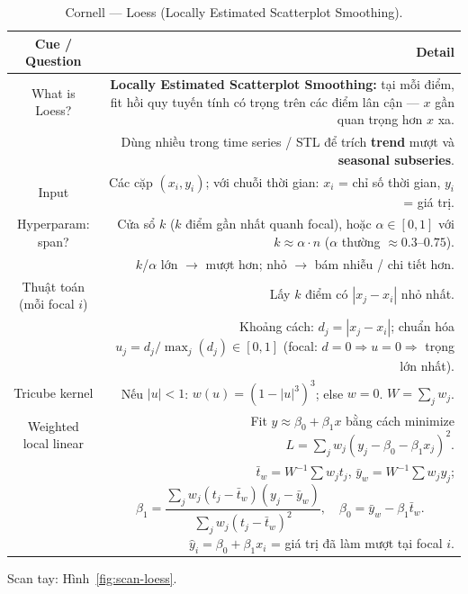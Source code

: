 \documentclass[12pt,a4paper]{article}
\newcommand{\cornellhead}{%
  \toprule
  \textbf{Cue / Question} & \textbf{Detail} \\
  \midrule
}
\begin{document}
\begin{table}[H]
  \centering
  \caption{Cornell --- Loess (Locally Estimated Scatterplot Smoothing).}
  \label{tab:cornell-loess}
  \small
  \begin{tabularx}{\textwidth}{@{}CD@{}}
    \cornellhead
    What is Loess? &
    \textbf{Locally Estimated Scatterplot Smoothing:}
    tại mỗi điểm, fit hồi quy tuyến tính có trọng trên các điểm lân cận ---
    \(x\) gần quan trọng hơn \(x\) xa. \\
                        & Dùng nhiều trong time series / STL để trích
    \textbf{trend} mượt và \textbf{seasonal subseries}. \\
    \addlinespace
    Input               &
    Các cặp \((x_i, y_i)\); với chuỗi thời gian:
    \(x_i\) = chỉ số thời gian, \(y_i\) = giá trị. \\
    \addlinespace
    Hyperparam: span?   &
    Cửa sổ \(k\) (\(k\) điểm gần nhất quanh focal), hoặc \(\alpha \in [0,1]\)
    với \(k \approx \alpha\cdot n\) (\(\alpha\) thường \(\approx 0.3\)--\(0.75\)). \\
                        & \(k\)/\(\alpha\) lớn $\to$ mượt hơn; nhỏ $\to$ bám nhiễu / chi tiết hơn. \\
    \addlinespace
    Thuật toán (mỗi focal \(i\)) &
    Lấy \(k\) điểm có \(|x_j - x_i|\) nhỏ nhất. \\
                        & Khoảng cách: \(d_j = |x_j - x_i|\);
    chuẩn hóa \(u_j = d_j / \max_j(d_j) \in [0,1]\)
    (focal: \(d=0 \Rightarrow u=0 \Rightarrow\) trọng lớn nhất). \\
    \addlinespace
    Tricube kernel      &
    Nếu \(|u|<1\): \(w(u)=(1-|u|^3)^3\); else \(w=0\).
    \(W=\sum_j w_j\). \\
    \addlinespace
    Weighted local linear &
    Fit \(y \approx \beta_0 + \beta_1 x\) bằng cách minimize
    \(L = \sum_j w_j (y_j - \beta_0 - \beta_1 x_j)^2\). \\
                        & \(\bar{t}_w = W^{-1}\sum w_j t_j\), \(\bar{y}_w = W^{-1}\sum w_j y_j\);
    \[
      \beta_1 =
      \frac{\sum_j w_j (t_j-\bar{t}_w)(y_j-\bar{y}_w)}
           {\sum_j w_j (t_j-\bar{t}_w)^2},\quad
      \beta_0 = \bar{y}_w - \beta_1 \bar{t}_w.
    \]
    \(\hat{y}_i = \beta_0 + \beta_1 x_i\) = giá trị đã làm mượt tại focal \(i\). \\
    \bottomrule
  \end{tabularx}
\end{table}

\noindent Scan tay: Hình~\ref{fig:scan-loess}.
\end{document}
